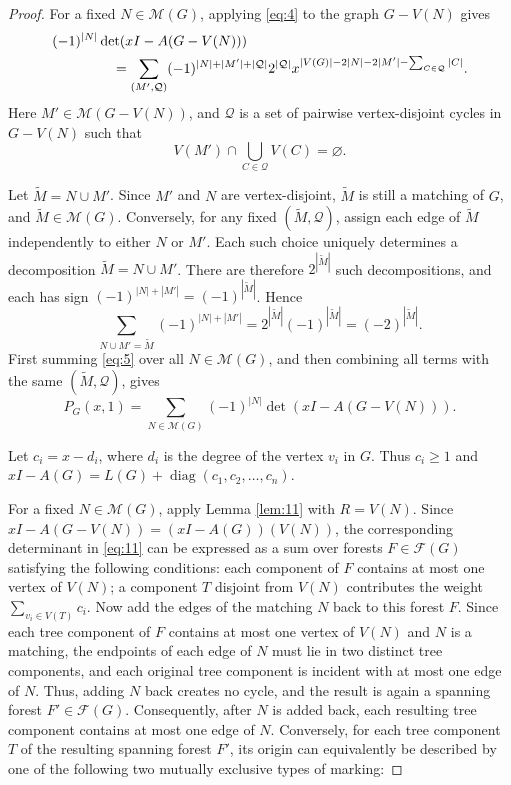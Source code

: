 \documentclass[11pt, a4paper]{article}
\begin{document}
\begin{proof}
For a fixed $N\in\mathcal{M}(G)$,
applying \eqref{eq:4} to the graph $G-V(N)$ gives
\begin{align}
(-1)^{|N|}
&\det(xI-A(G-V(N))) \notag\\
&\quad
=\sum_{(M',\mathcal{Q})}
(-1)^{|N|+|M'|+|\mathcal{Q}|}2^{|\mathcal{Q}|}
x^{|V(G)|-2|N|-2|M'|-\sum_{C\in\mathcal{Q}}|C|}.
\label{eq:5}
\end{align}
Here $M'\in\mathcal{M}(G-V(N))$,
and $\mathcal{Q}$ is a set of pairwise vertex-disjoint cycles in $G-V(N)$ such that
\[
V(M')\cap\bigcup_{C\in\mathcal{Q}}V(C)=\varnothing.
\]

Let $\widetilde{M}=N \cup M'$.
Since $M'$ and $N$ are vertex-disjoint,
$\widetilde{M}$ is still a matching of $G$,
and $\widetilde{M}\in\mathcal{M}(G)$.
Conversely, for any fixed $(\widetilde{M},\mathcal{Q})$,
assign each edge of $\widetilde{M}$ independently to either $N$ or $M'$.
Each such choice uniquely determines a decomposition $\widetilde{M}=N \cup M'$.
There are therefore $2^{|\widetilde{M}|}$ such decompositions, and each has sign
$(-1)^{|N|+|M'|}=(-1)^{|\widetilde{M}|}$. Hence
\[
\sum_{N \cup M'=\widetilde{M}}
(-1)^{|N|+|M'|}
=2^{|\widetilde{M}|}(-1)^{|\widetilde{M}|}
=(-2)^{|\widetilde{M}|}.
\]
First summing \eqref{eq:5} over all $N\in\mathcal{M}(G)$,
and then combining all terms with the same $(\widetilde{M},\mathcal{Q})$,
gives
\begin{equation}\label{eq:11}
P_G(x,1)
=
\sum_{N\in\mathcal{M}(G)}
(-1)^{|N|}
\det(xI-A(G-V(N))).
\end{equation}

Let $c_i=x-d_i$, where $d_i$ is the degree of the vertex $v_i$ in $G$.
Thus $c_i \geq 1$ and $xI-A(G)=L(G)+\operatorname{diag}(c_1, c_2, \dots, c_n)$.

For a fixed $N\in\mathcal{M}(G)$, apply Lemma \ref{lem:11} with $R=V(N)$.
Since $xI-A(G-V(N))=(xI-A(G))(V(N))$,
the corresponding determinant in \eqref{eq:11} can be expressed as
a sum over forests $F\in\mathcal{F}(G)$ satisfying the following conditions:
each component of $F$ contains at most one vertex of $V(N)$;
a component $T$ disjoint from $V(N)$ contributes the weight $\sum_{v_i\in V(T)}c_i$.
Now add the edges of the matching $N$ back to this forest $F$.
Since each tree component of $F$ contains at most one vertex of $V(N)$ and $N$ is a matching,
the endpoints of each edge of $N$ must lie in two distinct tree components,
and each original tree component is incident with at most one edge of $N$. Thus, adding $N$ back creates no cycle,
and the result is again a spanning forest $F' \in\mathcal{F}(G)$.
Consequently, after $N$ is added back, each resulting tree component contains at most one edge of $N$.
Conversely, for each tree component $T$ of the resulting spanning forest $F'$,
its origin can equivalently be described by one of the following two mutually exclusive types of marking:


\end{proof}
\end{document}
